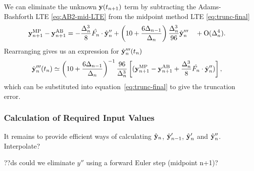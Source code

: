 We can eliminate the unknown $\mathbf{y}(t_{n+1})$ term by subtracting the Adams-Bashforth LTE \eqref{eq:AB2-mid-LTE} from the midpoint method LTE \eqref{eq:trunc-final}
\begin{equation}
 \mathbf{y}_{n+1}^{\text{MP}} - \mathbf{y}_{n+1}^{\text{AB}} =
  - \frac{\Delta_{n}^3}{8} \hat{F_{n}} \cdot \hat{\mathbf{y}}_{n}''
  + \left( 10 + \frac{6 \Delta_{n-1}}{\Delta_{n}} \right) \frac{\Delta_{n}^3}{96} \hat{\mathbf{y}}_{n}'''
  \quad + \text{O}(\Delta_{n}^4).
\end{equation}
Rearranging gives us an expression for $\hat{\mathbf{y}}_{n}'''(t_n)$
\begin{equation}
  \hat{\mathbf{y}}_{n}'''(t_n) \simeq
  \left( 10 + \frac{6 \Delta_{n-1}}{\Delta_{n}} \right)^{-1} \frac{96}{\Delta_{n}^3}
  \left[
    (\mathbf{y}_{n+1}^{\text{MP}} - \mathbf{y}_{n+1}^{\text{AB}} + \frac{\Delta_{n}^3}{8} \hat{F_{n}} \cdot \hat{\mathbf{y}}_{n}'')
    \right],
\end{equation}
which can be substituted into equation~\eqref{eq:trunc-final} to give the truncation error.

\subsubsection{Calculation of Required Input Values}

It remains to provide efficient ways of calculating $\hat{\mathbf{y}}_{n}$, $\hat{\mathbf{y}}_{n-1}'$, $\hat{\mathbf{y}}_{n}'$ and $\hat{\mathbf{y}}_{n}''$. Interpolate?

??ds could we eliminate $y''$ using a forward Euler step (midpoint  n+1)?


